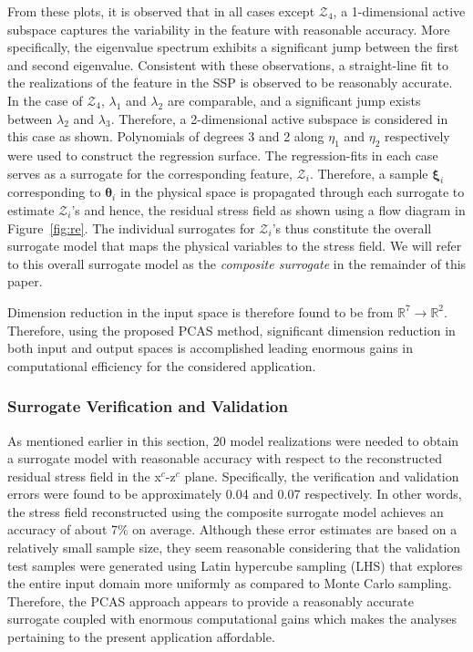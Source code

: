 %
From these plots, it is observed that in all cases except $\mathcal{Z}_4$, a 1-dimensional active
subspace captures the variability in the feature with reasonable accuracy. More specifically, the
eigenvalue spectrum exhibits a significant jump between the first and second eigenvalue. Consistent
with these observations, a straight-line fit to the realizations of the feature in the SSP is observed to be
reasonably accurate. In the case of $\mathcal{Z}_4$, $\lambda_1$ and $\lambda_2$ are comparable, and
a significant jump exists between $\lambda_2$ and $\lambda_3$. Therefore, a 2-dimensional active
subspace is considered in this case as shown. Polynomials of degrees 3 and 2 along $\eta_1$ and
$\eta_2$ respectively were used to construct the regression surface. The regression-fits in each case
serves as a surrogate for the corresponding feature, $\mathcal{Z}_i$. Therefore, a sample $\bm{\xi}_i$
corresponding to $\bm{\theta}_i$ in the physical space is propagated through each surrogate to estimate
$\mathcal{Z}_i$'s and hence, the residual stress field as shown using a flow diagram in Figure~\ref{fig:re}.
The individual surrogates for $\mathcal{Z}_i$'s thus constitute the overall surrogate model that maps the 
physical variables to the stress field. We will refer to this overall surrogate model as the \textit{composite
surrogate} in the remainder of this paper. 

Dimension reduction in the input space is therefore found to be from $\mathbb{R}^7\rightarrow\mathbb{R}^2$.
Therefore, using the proposed PCAS method, significant dimension reduction in both input and output
spaces is accomplished leading enormous gains in computational efficiency for the considered application.

\subsubsection{Surrogate Verification and Validation}
\label{subsub:vnv}

As mentioned earlier in this section, 20 model realizations were needed to obtain a surrogate model with
reasonable accuracy with respect to the reconstructed residual stress field in the x$^c$-z$^c$ plane. 
Specifically, the verification and validation errors were found to be approximately 0.04 and 
0.07 respectively. In other words, the stress field reconstructed using the
composite surrogate model achieves an accuracy of about 7$\%$ on average. Although these error estimates
are based on a relatively small sample size, they seem reasonable considering that the validation test samples
were generated using Latin hypercube sampling (LHS) that explores the entire input domain more uniformly
as compared to Monte Carlo sampling. Therefore, the PCAS approach appears to provide a reasonably 
accurate surrogate coupled with enormous computational gains which makes the analyses pertaining to
the present application affordable. 

